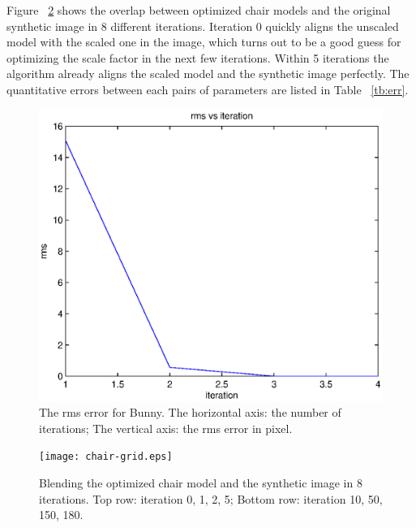 \documentclass[10pt,twocolumn,letterpaper]{article}
\begin{document}
\noindent
Figure ~\ref{fig:chairgrid} shows the overlap between optimized chair models and the original synthetic image in 8 different iterations. Iteration 0 quickly aligns the unscaled model with the scaled one in the image, which turns out to be a good guess for optimizing the scale factor in the next few iterations. Within 5 iterations the algorithm already aligns the scaled model and the synthetic image perfectly. The quantitative errors between each pairs of parameters are listed in Table ~\ref{tb:err}.

\begin{figure}[t]
\begin{center}
	\includegraphics[scale=0.5]{bunny-figure.eps}
\end{center}
	\caption{The rms error for Bunny. The horizontal axis: the number of iterations; The vertical axis: the rms error in pixel.}
\label{fig:bunnyplot}
\end{figure}

\begin{figure}
\begin{center}
	\texttt{[image: chair-grid.eps]}
\end{center}
   \caption{Blending the optimized chair model and the synthetic image in 8 iterations. Top row: iteration 0, 1, 2, 5; Bottom row: iteration 10, 50, 150, 180.}
\label{fig:chairgrid}
\end{figure}
\end{document}
